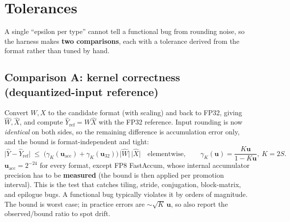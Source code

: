 \documentclass[10pt,letterpaper]{article}
\newcommand{\ur}{\mathbf{u}}
\begin{document}
\section{Tolerances}
\label{sec:tol}

A single ``epsilon per type'' cannot tell a functional bug from rounding noise, so the harness makes \textbf{two comparisons}, each with a tolerance derived from the format rather than tuned by hand.

\subsection*{Comparison A: kernel correctness (dequantized-input reference)}
Convert $W, X$ to the candidate format (with scaling) and back to FP32, giving $\hat W, \hat X$, and compute $\hat Y_{\mathrm{ref}} = \hat W \hat X$ with the FP32 reference. Input rounding is now \emph{identical} on both sides, so the remaining difference is accumulation error only, and the bound is format-independent and tight:
\[
  \lvert \hat Y - \hat Y_{\mathrm{ref}} \rvert \;\le\; \bigl(\gamma_{K}(\ur_{\mathrm{acc}}) + \gamma_{K}(\ur_{32})\bigr)\, \lvert \hat W \rvert\, \lvert \hat X \rvert
  \quad\text{elementwise},\qquad \gamma_K(\ur) = \frac{K\ur}{1-K\ur},\ K = 2S.
\]
$\ur_{\mathrm{acc}} = 2^{-24}$ for every format, except FP8 FastAccum, whose internal accumulator precision has to be \textbf{measured} (the bound is then applied per promotion interval). This is the test that catches tiling, stride, conjugation, block-matrix, and epilogue bugs. A functional bug typically violates it by orders of magnitude. The bound is worst case; in practice errors are $\sim\sqrt{K}\,\ur$, so also report the observed/bound ratio to spot drift.
\end{document}
